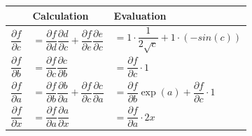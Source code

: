 \begin{table}[H]
    \renewcommand{\arraystretch}{2}
    \centering
    \begin{tabular}{l l l}
        & \textbf{Calculation} & \textbf{Evaluation} \\
        \hline
    
        $\dfrac{\partial f}{\partial c}$ & 
        $=
            \dfrac{\partial f}{\partial d}
            \dfrac{\partial d}{\partial c}
            +
            \dfrac{\partial f}{\partial e}
            \dfrac{\partial e}{\partial c}
        $ &
        $=
            1\cdot \dfrac{1}{2\sqrt{c}}+
            1\cdot (-sin(c))
        $\\

        $\dfrac{\partial f}{\partial b}$ &
        $=
            \dfrac{\partial f}{\partial c} 
            \dfrac{\partial c}{\partial b}
        $ &
        $
            = \dfrac{\partial f}{\partial c} \cdot 1
        $\\

        $\dfrac{\partial f}{\partial a}$ &
        $=
            \dfrac{\partial f}{\partial b} 
            \dfrac{\partial b}{\partial a}
            +
            \dfrac{\partial f}{\partial c} 
            \dfrac{\partial c}{\partial a}
        $ &
        $
            = \dfrac{\partial f}{\partial b}\exp(a)+
            \dfrac{\partial f}{\partial c}\cdot 1
        $\\

        $\dfrac{\partial f}{\partial x}$ &
        $=
            \dfrac{\partial f}{\partial a}
            \dfrac{\partial a}{\partial x}
        $ &
        $=\dfrac{\partial f}{\partial a}\cdot 2x$
    \end{tabular}
\end{table}










